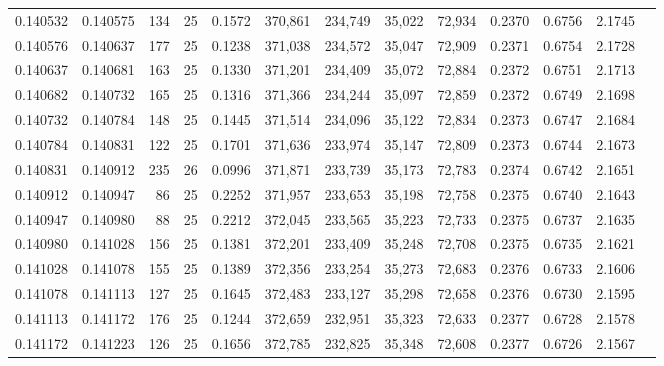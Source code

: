 \begin{tabular}{rrrrrrrrrrrrr}
0.140532 & 0.140575 &   134 &  25 &                                     0.1572 & 370,861 & 234,749 &  35,022 &  72,934 & 0.2370 & 0.6756 & 2.1745 \\
0.140576 & 0.140637 &   177 &  25 &                                     0.1238 & 371,038 & 234,572 &  35,047 &  72,909 & 0.2371 & 0.6754 & 2.1728 \\
0.140637 & 0.140681 &   163 &  25 &                                     0.1330 & 371,201 & 234,409 &  35,072 &  72,884 & 0.2372 & 0.6751 & 2.1713 \\
0.140682 & 0.140732 &   165 &  25 &                                     0.1316 & 371,366 & 234,244 &  35,097 &  72,859 & 0.2372 & 0.6749 & 2.1698 \\
0.140732 & 0.140784 &   148 &  25 &                                     0.1445 & 371,514 & 234,096 &  35,122 &  72,834 & 0.2373 & 0.6747 & 2.1684 \\
0.140784 & 0.140831 &   122 &  25 &                                     0.1701 & 371,636 & 233,974 &  35,147 &  72,809 & 0.2373 & 0.6744 & 2.1673 \\
0.140831 & 0.140912 &   235 &  26 &                                     0.0996 & 371,871 & 233,739 &  35,173 &  72,783 & 0.2374 & 0.6742 & 2.1651 \\
0.140912 & 0.140947 &    86 &  25 &                                     0.2252 & 371,957 & 233,653 &  35,198 &  72,758 & 0.2375 & 0.6740 & 2.1643 \\
0.140947 & 0.140980 &    88 &  25 &                                     0.2212 & 372,045 & 233,565 &  35,223 &  72,733 & 0.2375 & 0.6737 & 2.1635 \\
0.140980 & 0.141028 &   156 &  25 &                                     0.1381 & 372,201 & 233,409 &  35,248 &  72,708 & 0.2375 & 0.6735 & 2.1621 \\
0.141028 & 0.141078 &   155 &  25 &                                     0.1389 & 372,356 & 233,254 &  35,273 &  72,683 & 0.2376 & 0.6733 & 2.1606 \\
0.141078 & 0.141113 &   127 &  25 &                                     0.1645 & 372,483 & 233,127 &  35,298 &  72,658 & 0.2376 & 0.6730 & 2.1595 \\
0.141113 & 0.141172 &   176 &  25 &                                     0.1244 & 372,659 & 232,951 &  35,323 &  72,633 & 0.2377 & 0.6728 & 2.1578 \\
0.141172 & 0.141223 &   126 &  25 &                                     0.1656 & 372,785 & 232,825 &  35,348 &  72,608 & 0.2377 & 0.6726 & 2.1567 \\

\end{tabular}
